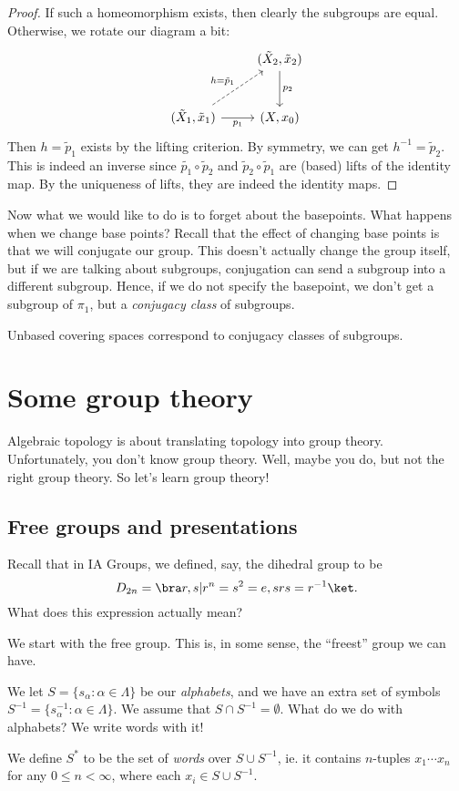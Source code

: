 \documentclass[a4paper]{article}
\begin{document}
\begin{proof}
  If such a homeomorphism exists, then clearly the subgroups are equal. Otherwise, we rotate our diagram a bit:
  \[
    \begin{tikzcd}[row sep=large]
      & (\tilde{X}_2, \tilde{x}_2) \ar[d, "p_2"]\\
      (\tilde{X}_1, \tilde{x}_1) \ar [r, "p_1"'] \ar [ru, dashed, "h = \tilde{p}_1"] & (X, x_0)
    \end{tikzcd}
  \]
  Then $h = \tilde{p}_1$ exists by the lifting criterion. By symmetry, we can get $h^{-1} = \tilde{p}_2$. This is indeed an inverse since $\tilde{p_1}\circ \tilde{p}_2$ and $\tilde{p}_2 \circ \tilde{p}_1$ are (based) lifts of the identity map. By the uniqueness of lifts, they are indeed the identity maps.
\end{proof}
Now what we would like to do is to forget about the basepoints. What happens when we change base points? Recall that the effect of changing base points is that we will conjugate our group. This doesn't actually change the group itself, but if we are talking about subgroups, conjugation can send a subgroup into a different subgroup. Hence, if we do not specify the basepoint, we don't get a subgroup of $\pi_1$, but a \emph{conjugacy class} of subgroups.

\begin{prop}
  Unbased covering spaces correspond to conjugacy classes of subgroups.
\end{prop}

\section{Some group theory}
Algebraic topology is about translating topology into group theory. Unfortunately, you don't know group theory. Well, maybe you do, but not the right group theory. So let's learn group theory!

\subsection{Free groups and presentations}
Recall that in IA Groups, we defined, say, the dihedral group to be
\[
  D_{2n} = \bra r, s | r^n = s^2 = e, srs = r^{-1}\ket.
\]
What does this expression actually mean?

We start with the free group. This is, in some sense, the ``freest'' group we can have.

\begin{defi}
 We let $S = \{s_\alpha: \alpha \in \Lambda\}$ be our \emph{alphabets}, and we have an extra set of symbols $S^{-1} = \{s_\alpha^{-1}: \alpha \in \Lambda\}$. We assume that $S\cap S^{-1} = \emptyset$. What do we do with alphabets? We write words with it!

 We define $S^*$ to be the set of \emph{words} over $S\cup S^{-1}$, ie. it contains $n$-tuples $x_1 \cdots x_n$ for any $0 \leq n < \infty$, where each $x_i \in S \cup S^{-1}$.
\end{defi}
\end{document}
